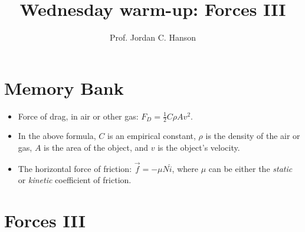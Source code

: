 \documentclass{article}
\begin{document}
\twocolumn

\title{Wednesday warm-up: Forces III}
\author{Prof. Jordan C. Hanson}

\maketitle

\section{Memory Bank}

\begin{itemize}
\item Force of drag, in air or other gas: $F_D = \frac{1}{2}C \rho A v^2$.
\item In the above formula, $C$ is an empirical constant, $\rho$ is the density of the air or gas, $A$ is the area of the object, and $v$ is the object's velocity.
\item The horizontal force of friction: $\vec{f} = -\mu N \hat{i}$, where $\mu$ can be either the \textit{static} or \textit{kinetic} coefficient of friction.
\end{itemize}

\section{Forces III}
\end{document}
